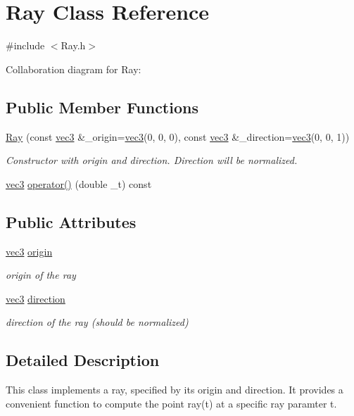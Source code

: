 \hypertarget{classRay}{}\section{Ray Class Reference}
\label{classRay}


{\ttfamily \#include $<$Ray.\+h$>$}



Collaboration diagram for Ray\+:
\subsection*{Public Member Functions}
\begin{DoxyCompactItemize}
\item 
\hyperlink{classRay_a773588948dfa8469c81f43907f6a7c63}{Ray} (const \hyperlink{classvec3}{vec3} \&\+\_\+origin=\hyperlink{classvec3}{vec3}(0, 0, 0), const \hyperlink{classvec3}{vec3} \&\+\_\+direction=\hyperlink{classvec3}{vec3}(0, 0, 1))
\begin{DoxyCompactList}\small\item\em Constructor with origin and direction. Direction will be normalized. \end{DoxyCompactList}\item 
\hyperlink{classvec3}{vec3} \hyperlink{classRay_adcb42927ac5d583e1296d2ec4e5b8b1a}{operator()} (double \+\_\+t) const 
\end{DoxyCompactItemize}
\subsection*{Public Attributes}
\begin{DoxyCompactItemize}
\item 
\hyperlink{classvec3}{vec3} \hyperlink{classRay_a3677f264c55cbe2f2cf450f9e0efa241}{origin}
\begin{DoxyCompactList}\small\item\em origin of the ray \end{DoxyCompactList}\item 
\hyperlink{classvec3}{vec3} \hyperlink{classRay_a2b864cd91328207dc66e3ab4cd1e1e36}{direction}
\begin{DoxyCompactList}\small\item\em direction of the ray (should be normalized) \end{DoxyCompactList}\end{DoxyCompactItemize}


\subsection{Detailed Description}
This class implements a ray, specified by its origin and direction. It provides a convenient function to compute the point ray(t) at a specific ray paramter t. 


